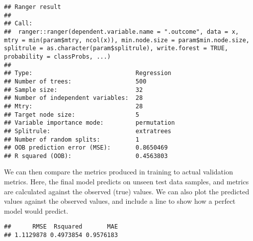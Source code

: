 \documentclass[
  oneside]{book}
\newenvironment{Shaded}{\begin{snugshade}}{\end{snugshade}}
\newcommand{\AttributeTok}[1]{\textcolor[rgb]{0.77,0.63,0.00}{#1}}
\newcommand{\FunctionTok}[1]{\textcolor[rgb]{0.00,0.00,0.00}{#1}}
\newcommand{\NormalTok}[1]{#1}
\newcommand{\OtherTok}[1]{\textcolor[rgb]{0.56,0.35,0.01}{#1}}
\newcommand{\SpecialCharTok}[1]{\textcolor[rgb]{0.00,0.00,0.00}{#1}}
\begin{document}
\begin{verbatim}
## Ranger result
## 
## Call:
##  ranger::ranger(dependent.variable.name = ".outcome", data = x,      mtry = min(param$mtry, ncol(x)), min.node.size = param$min.node.size,      splitrule = as.character(param$splitrule), write.forest = TRUE,      probability = classProbs, ...) 
## 
## Type:                             Regression 
## Number of trees:                  500 
## Sample size:                      32 
## Number of independent variables:  28 
## Mtry:                             28 
## Target node size:                 5 
## Variable importance mode:         permutation 
## Splitrule:                        extratrees 
## Number of random splits:          1 
## OOB prediction error (MSE):       0.8650469 
## R squared (OOB):                  0.4563803
\end{verbatim}

We can then compare the metrics produced in training to actual validation metrics. Here,
the final model predicts on unseen test data samples, and metrics are calculated
against the observed (true) values. We can also plot the predicted values against the
observed values, and include a line to show how a perfect model would predict.

\begin{Shaded}
\end{Shaded}

\begin{verbatim}
##      RMSE  Rsquared       MAE 
## 1.1129878 0.4973854 0.9576183
\end{verbatim}
\end{document}
